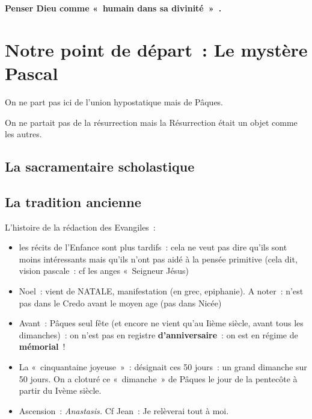\textbf{Penser Dieu comme «~humain dans sa divinité~»~.}

\hypertarget{notre-point-de-duxe9part-le-mystere-pascal}{%
\section{Notre point de départ~: Le mystère Pascal}\label{notre-point-de-duxe9part-le-mystere-pascal}}

On ne part pas ici de l'union hypostatique mais de Pâques.

On ne partait pas de la résurrection mais la Résurrection était un objet
comme les autres.

\hypertarget{la-sacramentaire-scholastique}{%
\subsection{La sacramentaire
scholastique}\label{la-sacramentaire-scholastique}}

\hypertarget{la-tradition-ancienne}{%
\subsection{La tradition ancienne}\label{la-tradition-ancienne}}

L'histoire de la rédaction des Evangiles~:

\begin{itemize}
\item
  les récits de l'Enfance sont plus tardifs~: cela ne veut pas dire
  qu'ils sont moins intéressants mais qu'ils n'ont pas aidé à la pensée
  primitive (cela dit, vision pascale~: cf les anges «~Seigneur Jésus)
\end{itemize}

\begin{itemize}
\item
  Noel~: vient de NATALE, manifestation (en grec, epiphanie). A noter~:
  n'est pas dans le Credo avant le moyen age (pas dans Nicée)
\item
  Avant~: Pâques seul fête (et encore ne vient qu'au Iième siècle, avant
  tous les dimanches)~: on n'est pas en registre
  \textbf{d'anniversaire}~: on est en régime de
  \textbf{mémorial}~!
\item
  La «~cinquantaine joyeuse~»~: désignait ces 50 jours~: un grand
  dimanche sur 50 jours. On a cloturé ce «~dimanche~» de Pâques le jour
  de la pentecôte à partir du Ivème siècle.
\item
  Ascension~: \emph{Anastasis.} Cf Jean~: Je relèverai tout à moi.
\end{itemize}

